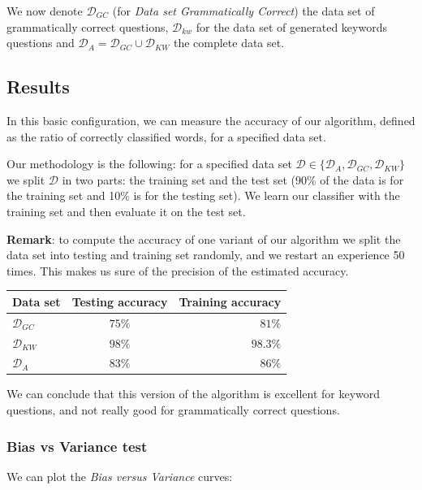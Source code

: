 We now denote $\mathcal{D}_{GC}$ (for \textit{Data set Grammatically Correct}) the data set of grammatically correct questions, $\mathcal{D}_{kw}$ for the data set of generated keywords questions and $\mathcal{D}_A = \mathcal{D}_{GC} \cup  \mathcal{D}_{KW}$ the complete data set.

\subsection{Results}

In this basic configuration, we can measure the accuracy of our algorithm, defined as the ratio of correctly classified words, for a specified data set.

Our methodology is the following: for a specified data set $\mathcal{D} \in \{\mathcal{D}_A, \mathcal{D}_{GC}, \mathcal{D}_{KW}\}$ we split $\mathcal{D}$ in two parts: the training set and the test set (90\% of the data is for the training set and 10\% is for the testing set). We learn our classifier with the training set and then evaluate it on the test set.

\textbf{Remark}: to compute the accuracy of one variant of our algorithm we split the data set into testing and training set randomly, and we restart an experience 50 times. This makes us sure of the precision of the estimated accuracy.

\begin{center}
\begin{tabular}{|l|c|r|}
  \hline
  Data set &  Testing accuracy  & Training accuracy \\
  \hline
  $\mathcal{D}_{GC}$ &  $75\%$& $81\%$  \\
  $\mathcal{D}_{KW}$ & $98\%$ & $98.3\%$ \\
  $\mathcal{D}_{A}$    & $83\%$ & $86\%$ \\
  \hline
\end{tabular}
\end{center}

We can conclude that this version of the algorithm is excellent for keyword questions, and not really good for grammatically correct questions.

\subsubsection{Bias vs Variance test}

We can plot the \textit{Bias versus Variance} curves:

